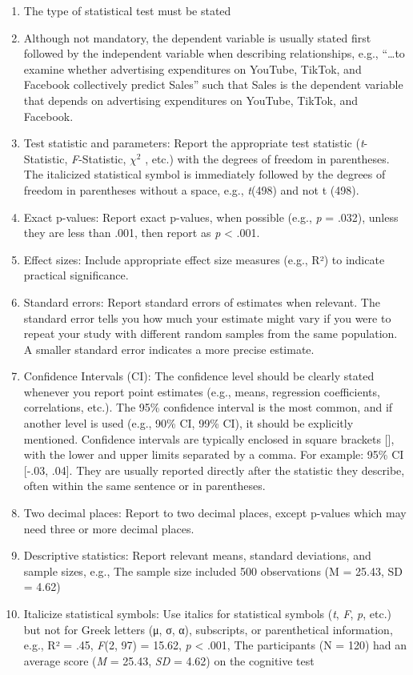\documentclass[
]{article}
\begin{document}
\begin{enumerate}
\def\labelenumi{\arabic{enumi}.}
\item
  The type of statistical test must be stated
\item
  Although not mandatory, the dependent variable is usually stated first
  followed by the independent variable when describing relationships,
  e.g., ``\ldots to examine whether advertising expenditures on YouTube,
  TikTok, and Facebook collectively predict Sales'' such that Sales is
  the dependent variable that depends on advertising expenditures on
  YouTube, TikTok, and Facebook.
\item
  Test statistic and parameters: Report the appropriate test statistic
  (\emph{t}-Statistic, \emph{F}-Statistic, \(\chi^2\) , etc.) with the
  degrees of freedom in parentheses. The italicized statistical symbol
  is immediately followed by the degrees of freedom in parentheses
  without a space, e.g., \emph{t}(498) and not t (498).
\item
  Exact p-values: Report exact p-values, when possible (e.g., \emph{p} =
  .032), unless they are less than .001, then report as \emph{p}
  \textless{} .001.
\item
  Effect sizes: Include appropriate effect size measures (e.g., R²) to
  indicate practical significance.
\item
  Standard errors: Report standard errors of estimates when relevant.
  The standard error tells you how much your estimate might vary if you
  were to repeat your study with different random samples from the same
  population. A smaller standard error indicates a more precise
  estimate.
\item
  Confidence Intervals (CI): The confidence level should be clearly
  stated whenever you report point estimates (e.g., means, regression
  coefficients, correlations, etc.). The 95\% confidence interval is the
  most common, and if another level is used (e.g., 90\% CI, 99\% CI), it
  should be explicitly mentioned. Confidence intervals are typically
  enclosed in square brackets {[}{]}, with the lower and upper limits
  separated by a comma. For example: 95\% CI {[}-.03, .04{]}. They are
  usually reported directly after the statistic they describe, often
  within the same sentence or in parentheses.
\item
  Two decimal places: Report to two decimal places, except p-values
  which may need three or more decimal places.
\item
  Descriptive statistics: Report relevant means, standard deviations,
  and sample sizes, e.g., The sample size included 500 observations (M =
  25.43, SD = 4.62)
\item
  Italicize statistical symbols: Use italics for statistical symbols
  (\emph{t}, \emph{F}, \emph{p}, etc.) but not for Greek letters (μ, σ,
  α), subscripts, or parenthetical information, e.g., R² = .45,
  \emph{F}(2, 97) = 15.62, \emph{p} \textless{} .001, The participants
  (N = 120) had an average score (\emph{M} = 25.43, \emph{SD} = 4.62) on
  the cognitive test
\end{enumerate}
\end{document}
